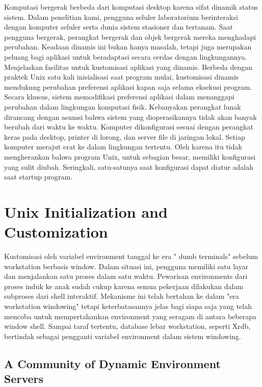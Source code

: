 Komputasi bergerak berbeda dari komputasi desktop karena sifat dinamik status sistem. Dalam penelitian kami, pengguna seluler laboratorium berinteraksi dengan komputer seluler serta dunia sistem stasioner dan tertanam. Saat pengguna bergerak, perangkat bergerak dan objek bergerak mereka menghadapi perubahan. Keadaan dinamis ini bukan hanya masalah, tetapi juga merupakan peluang bagi aplikasi untuk beradaptasi secara cerdas dengan lingkungannya.
Menjelaskan fasilitas untuk kustomisasi aplikasi yang dinamis. Berbeda dengan praktek Unix satu kali inisialisasi saat program mulai, kustomisasi dinamis mendukung perubahan preferensi aplikasi kapan saja selama eksekusi program. Secara khusus, sistem memodifikasi preferensi aplikasi dalam menanggapi perubahan dalam lingkungan komputasi fisik.
Kebanyakan perangkat lunak dirancang dengan asumsi bahwa sistem yang dioperasikannya tidak akan banyak berubah dari waktu ke waktu. Komputer dikonfigurasi sesuai dengan perangkat keras pada desktop, printer di lorong, dan server file di jaringan lokal. Setiap komputer merajut erat ke dalam lingkungan tertentu. Oleh karena itu tidak mengherankan bahwa program Unix, untuk sebagian besar, memiliki konfigurasi yang sulit diubah. Seringkali, satu-satunya saat konfigurasi dapat diatur adalah saat startup program.


\section {Unix Initialization and Customization}

Kustomisasi oleh variabel environment tanggal ke era " dumb terminals" sebelum workstation berbasis window. Dalam situasi ini, pengguna memiliki satu layar dan menjalankan satu proses dalam satu waktu. Pewarisan environments dari proses induk ke anak sudah cukup karena semua pekerjaan dilakukan dalam subproses dari shell interaktif. Mekanisme ini telah bertahan ke dalam "era workstation windowing" tetapi keterbatasannya jelas bagi siapa saja yang telah mencoba untuk mempertahankan environment yang seragam di antara beberapa window shell. Sampai taraf tertentu, database lebar workstation, seperti Xrdb, bertindak sebagai pengganti variabel environment dalam sistem windowing. \cite{schilit1993customizing}

\subsection {A Community of Dynamic Environment Servers}

